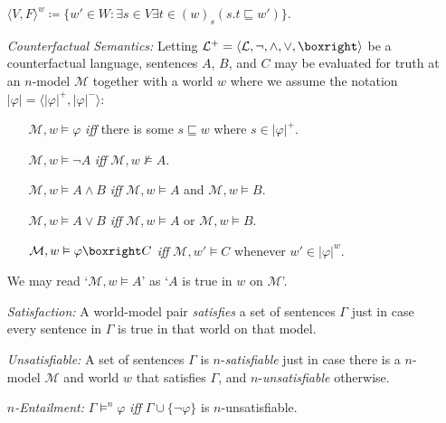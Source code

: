\documentclass[a4paper, 11pt]{article} %
\newcommand{\tuple}[1]{\langle#1\rangle} %
\newcommand{\set}[1]{\lbrace#1\rbrace} %
\newcommand{\M}[0]{\mathcal{M}}
\renewcommand{\L}[0]{\mathcal{L}}
\renewcommand{\vert}[1]{\lvert#1\rvert}
\begin{document}
\begin{enumerate}
      $\tuple{V,F}^w\coloneq \set{w'\in W:\exists s\in V\exists t\in(w)_s(s.t\sqsubseteq w')}$.
  \item[\it Counterfactual Semantics:] Letting $\L^+=\tuple{\L,\neg,\wedge,\vee,\boxright}$ be a counterfactual language, sentences $A$, $B$, and $C$ may be evaluated for truth at an $n$-model $\M$ together with a world $w$ where we assume the notation $\vert{\varphi}=\tuple{\vert{\varphi}^+,\vert{\varphi}^-}$:
    \begin{itemize}
      \item[] $\M, w \vDash \varphi$ \textit{iff} there is some $s \sqsubseteq w$ where $s \in \vert{\varphi}^+$.
      \item[] $\M, w \vDash \neg A$ \textit{iff} $\M, w \nvDash A$.
      \item[] $\M, w \vDash A \wedge B$ \textit{iff} $\M, w \vDash A$ and $\M, w \vDash B$.
      \item[] $\M, w \vDash A \vee B$ \textit{iff} $\M, w \vDash A$ or $\M, w \vDash B$.
      \item[] $\M, w \vDash \varphi\boxright C$ \textit{iff} $\M, w' \vDash C$ whenever $w'\in\vert{\varphi}^w$.
    \end{itemize}
    We may read `$\M, w \vDash A$' as `$A$ is true in $w$ on $\M$'.
  \item[\it Satisfaction:] A world-model pair \textit{satisfies} a set of sentences $\Gamma$ just in case every sentence in $\Gamma$ is true in that world on that model.
  \item[\it Unsatisfiable:] A set of sentences $\Gamma$ is $n$-\textit{satisfiable} just in case there is a $n$-model $\M$ and world $w$ that satisfies $\Gamma$, and $n$-\textit{unsatisfiable} otherwise.
  \item[\it $n$-Entailment:] $\Gamma \vDash^n \varphi$ \textit{iff} $\Gamma\cup\set{\neg\varphi}$ is $n$-unsatisfiable. 
\end{enumerate}
\end{document}
